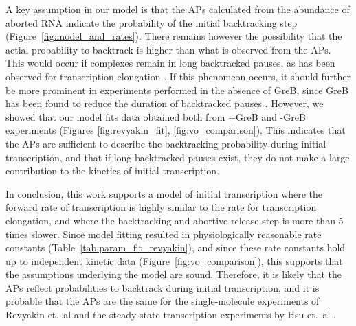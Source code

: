A key assumption in our model is that the APs calculated from the abundance of
aborted RNA indicate the probability of the initial backtracking step
(Figure~\ref{fig:model_and_rates}). There remains however the possibility that
the actial probability to backtrack is higher than what is observed from the
APs. This would occur if complexes remain in long backtracked
pauses, as has been observed for transcription elongation
\cite{shaevitz_backtracking_2003}. If this phenomeon occurs, it should further
be more prominent in experiments performed in the absence of GreB, since GreB
has been found to reduce the duration of backtracked pauses
\cite{shaevits_backtracking_2003}. However, we showed that our model fits data
obtained both from +GreB and -GreB experiments (Figures
\ref{fig:revyakin_fit}, \ref{fig:vo_comparison}). This indicates that the APs
are sufficient to describe the backtracking probability during initial
transcription, and that if long backtracked pauses exist, they do not make a
large contribution to the kinetics of initial transcription.

In conclusion, this work supports a model of initial transcription where the
forward rate of transcription is highly similar to the rate for transcription
elongation, and where the backtracking and abortive release step is more than
5 times slower. Since model fitting resulted in physiologically reasonable
rate constants (Table~\ref{tab:param_fit_revyakin}), and since these rate
constants hold up to independent kinetic data
(Figure~\ref{fig:vo_comparison}), this supports that the assumptions
underlying the model are sound. Therefore, it is likely that the APs
reflect probabilities to backtrack during initial transcription, and it is
probable that the APs are the same for the single-molecule experiments of
Revyakin et.\ al \cite{revyakin_abortive_2006} and the steady state
transcription experiments by Hsu et.\ al \cite{hsu_initial_2006}.
 
